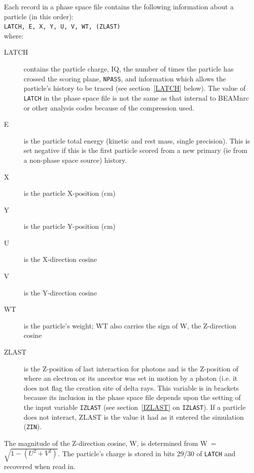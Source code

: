\documentclass[12pt,twoside]{article}
\begin{document}
Each record in a phase space file contains the following information
about a particle (in this order):\\
\verb+LATCH, E, X, Y, U, V, WT, (ZLAST)+\\
where:
\vspace*{-4mm}
\begin{description}
\item [LATCH] contains the particle charge, IQ, the number of times
the particle has crossed the scoring plane, \verb+NPASS+, and information
which allows the particle's history to be traced (see section~\ref{LATCH}
below).  The value of \verb+LATCH+ in the phase space file is not the
same as that internal to BEAMnrc or other analysis codes
because of the compression used.
\item [E] is the particle total energy (kinetic and rest mass, single
precision).  This is set negative if this is the first particle scored
from a new primary (ie from a non-phase space source) history.
\item [X] is the particle X-position (cm)
\item [Y] is the particle Y-position (cm)
\item [U] is the X-direction cosine
\item [V] is the Y-direction cosine
\item [WT] is the particle's weight; WT also carries the
sign of W, the Z-direction cosine
\item [ZLAST] is the Z-position of last interaction for photons and is
the Z-position of where an electron or its ancestor was set in motion by
a photon (i.e. it does not flag the creation site of delta rays. This
variable is in brackets because its inclusion in the phase space file
depends upon the setting of the input variable
\verb+IZLAST+ (see section~\ref{IZLAST} on \verb+IZLAST+).  If a
particle does not interact, ZLAST is the value it had as it entered the
simulation ({\tt ZIN}).
 

\end{description}

The magnitude of the Z-direction cosine, W, is determined from
W~=~$\sqrt{1-(U^2+V^2)}$. The particle's charge is stored in bits 29/30
of \verb+LATCH+ and recovered when read in.
\end{document}
